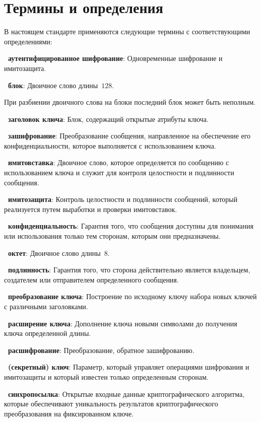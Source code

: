 \chapter{Термины и определения}

В настоящем стандарте применяются  
следующие термины с соответствующими определениями:

{\bf \thedefctr~аутентифицированное шифрование}:
Одновременные шифрование и имитозащита.

{\bf \thedefctr~блок}:
Двоичное слово длины~$128$.

\begin{note*}
При разбиении двоичного слова на блоки последний блок может быть неполным.
\end{note*}

{\bf \thedefctr~заголовок ключа}:
Блок, содержащий открытые атрибуты ключа.

{\bf \thedefctr~зашифрование}:
Преобразование сообщения,
направленное на обеспечение его конфиденциальности,
которое выполняется с использованием ключа.

{\bf \thedefctr~имитовставка}:
Двоичное слово, 
которое определяется по сообщению с использованием ключа 
и служит для контроля целостности и подлинности сообщения.

{\bf \thedefctr~имитозащита}:
Контроль целостности и подлинности сообщений, 
который реализуется путем выработки и проверки имитовставок.

{\bf \thedefctr~конфиденциальность}:
Гарантия того, что сообщения доступны для понимания или использования
только тем сторонам, которым они предназначены.

{\bf \thedefctr~октет}:
Двоичное слово длины~$8$.

{\bf \thedefctr~подлинность}:
Гарантия того, что сторона действительно является владельцем, 
создателем или отправителем определенного сообщения.

{\bf \thedefctr~преобразование ключа}:
Построение по исходному ключу набора новых ключей 
с различными заголовками.

{\bf \thedefctr~расширение ключа}:
Дополнение ключа новыми символами до получения ключа определенной длины.

{\bf \thedefctr~расшифрование}:
Преобразование, обратное зашифрованию.

{\bf \thedefctr~(секретный) ключ}:
Параметр, который управляет операциями шифрования 
и имитозащиты и который известен только определенным сторонам.

{\bf \thedefctr~синхропосылка}:
Открытые входные данные криптографического алгоритма,
которые обеспечивают уникальность результатов 
криптографического преобразования на фиксированном ключе.

